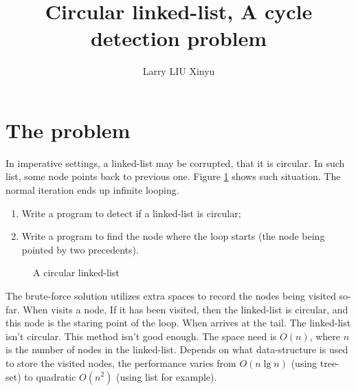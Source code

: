 \documentclass{article}
\begin{document}
\title{Circular linked-list, A cycle detection problem}
\author{Larry LIU Xinyu}
\maketitle

\section{The problem}

In imperative settings, a linked-list may be corrupted, that it is circular. In such list, some node
points back to previous one. Figure \ref{fig:circular-list} shows such situation.
The normal iteration ends up infinite looping.
  \begin{enumerate}
    \item Write a program to detect if a linked-list is circular;
    \item Write a program to find the node where the loop starts (the node being pointed by two precedents).
  \end{enumerate}

\begin{figure}[htdp]
\centering
{}
\caption{A circular linked-list}
\label{fig:circular-list}
\end{figure}

The brute-force solution utilizes extra spaces to record the nodes being visited so-far.
When visits a node, If it has been visited, then the linked-list is circular, and this
node is the staring point of the loop. When arrives at the tail. The linked-list isn't
circular. This method isn't good enough. The space need is $O(n)$, where $n$ is the
number of nodes in the linked-list. Depends on what data-structure is used to store
the visited nodes, the performance varies from $O(n \lg n)$ (using tree-set) to quadratic $O(n^2)$
(using list for example).
\end{document}
